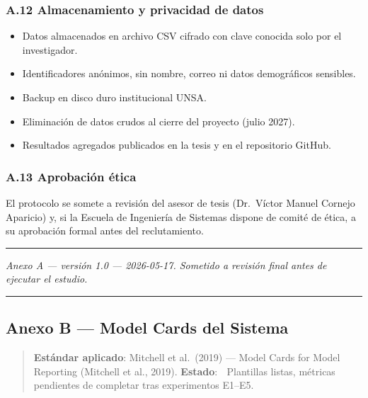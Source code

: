 \subsubsection{A.12 Almacenamiento y privacidad de
datos}\label{a.12-almacenamiento-y-privacidad-de-datos}

\begin{itemize}
\tightlist
\item
  Datos almacenados en archivo CSV cifrado con clave conocida solo por
  el investigador.
\item
  Identificadores anónimos, sin nombre, correo ni datos demográficos
  sensibles.
\item
  Backup en disco duro institucional UNSA.
\item
  Eliminación de datos crudos al cierre del proyecto (julio 2027).
\item
  Resultados agregados publicados en la tesis y en el repositorio
  GitHub.
\end{itemize}

\subsubsection{A.13 Aprobación ética}\label{a.13-aprobaciuxf3n-uxe9tica}

El protocolo se somete a revisión del asesor de tesis (Dr.~Víctor Manuel
Cornejo Aparicio) y, si la Escuela de Ingeniería de Sistemas dispone de
comité de ética, a su aprobación formal antes del reclutamiento.

\begin{center}\rule{0.5\linewidth}{0.5pt}\end{center}

\emph{Anexo A --- versión 1.0 --- 2026-05-17. Sometido a revisión final
antes de ejecutar el estudio.}

\begin{center}\rule{0.5\linewidth}{0.5pt}\end{center}

\subsection{Anexo B --- Model Cards del
Sistema}\label{anexo-b-model-cards-del-sistema}

\begin{quote}
\textbf{Estándar aplicado}: Mitchell et al.~(2019) --- Model Cards for
Model Reporting (Mitchell et al., 2019). \textbf{Estado}: 📐 Plantillas
listas, métricas pendientes de completar tras experimentos E1--E5.
\end{quote}

